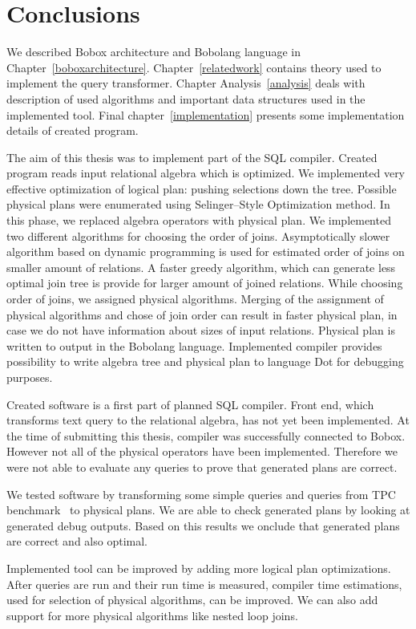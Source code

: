 \chapter{Conclusions}

We described Bobox architecture and Bobolang language in Chapter~\ref{boboxarchitecture}. Chapter~\ref{relatedwork} contains theory used to implement the query transformer. Chapter Analysis~\ref{analysis} deals with description of used algorithms and important data structures used in the implemented tool. Final chapter~\ref{implementation} presents some implementation details of created program.

The aim of this thesis was to implement part of the SQL compiler. Created program reads input relational algebra which is optimized. We implemented very effective optimization of logical plan: pushing selections down the tree. Possible physical plans were enumerated using Selinger--Style Optimization method. In this phase, we replaced algebra operators with physical plan. We implemented two different algorithms for choosing the order of joins. Asymptotically slower algorithm based on dynamic programming is used for estimated order of joins on smaller amount of relations. 
A faster greedy algorithm, which can generate less optimal join tree is provide for larger amount of joined relations. While choosing order of joins, we assigned physical algorithms. Merging of the assignment of physical algorithms and chose of join order can result in faster physical plan, in case we do not have information about sizes of input relations. Physical plan is written to output in the Bobolang language. Implemented compiler provides possibility to write algebra tree and physical plan to language Dot for debugging purposes.


Created software is a first part of planned SQL compiler. Front end, which transforms text query to the relational algebra, has not yet been implemented. At the time of submitting this thesis, compiler was successfully connected to Bobox. However not all of the physical operators have been implemented. Therefore we were not able to evaluate any queries to prove that generated plans are correct.

We tested software by transforming some simple queries and queries from TPC benchmark~\cite{benchmark} to physical plans. We are able to check generated plans by looking at generated debug outputs. Based on this results we onclude that generated plans are correct and also optimal. 

Implemented tool can be improved by adding more logical plan optimizations.
After queries are run and their run time is measured, compiler time estimations, used for selection of physical algorithms, can be improved. 
We can also add support for more physical algorithms like nested loop joins.

